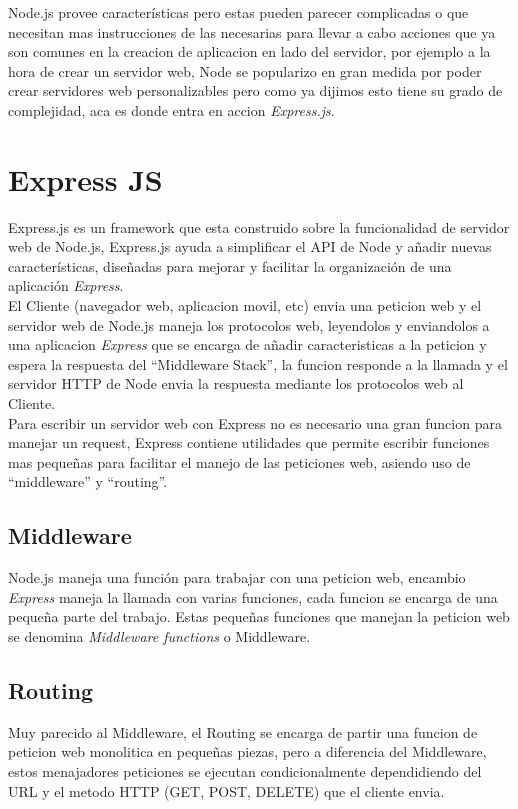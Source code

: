    Node.js provee caracter\'isticas pero estas pueden parecer complicadas o que necesitan mas instrucciones de las necesarias para llevar a cabo acciones que ya son comunes en la creacion de aplicacion en lado del servidor, por ejemplo a la hora de crear un servidor web, Node se popularizo en gran medida por poder crear servidores web personalizables pero como ya dijimos esto tiene su grado de complejidad, aca es donde entra en accion \emph{Express.js}.

  \section{Express JS}
  \label{sec:express_js}
    Express.js es un framework que esta construido sobre la funcionalidad de servidor web de Node.js, Express.js ayuda a simplificar el API de Node y a\~nadir nuevas caracter\'isticas, dise\~nadas para mejorar y facilitar la organizaci\'on de una aplicaci\'on \emph{Express}.\\

    El Cliente (navegador web, aplicacion movil, etc) envia una peticion web y el servidor web de Node.js maneja los protocolos web, leyendolos y enviandolos a una aplicacion \emph{Express} que se encarga de a\~nadir caracteristicas a la peticion y espera la respuesta del ``Middleware Stack'', la funcion responde a la llamada y el servidor HTTP de Node envia la respuesta mediante los protocolos web al Cliente.\\

    Para escribir un servidor web con Express no es necesario una gran funcion para manejar un request, Express contiene utilidades que permite escribir funciones mas peque\~nas para facilitar el manejo de las peticiones web, asiendo uso de ``middleware'' y ``routing''.

    \subsection{Middleware}
    \label{sub:middleware}
      Node.js maneja una funci\'on para trabajar con una peticion web, encambio \emph{Express} maneja la llamada con varias funciones, cada funcion se encarga de una peque\~na parte del trabajo. Estas peque\~nas funciones que manejan la peticion web se denomina \emph{Middleware functions} o Middleware.


    \subsection{Routing}
    \label{sub:routing}
      Muy parecido al Middleware, el Routing se encarga de partir una funcion de peticion web monolitica en peque\~nas piezas, pero a diferencia del Middleware, estos menajadores peticiones se ejecutan condicionalmente dependidiendo del URL y el metodo HTTP (GET, POST, DELETE) que el cliente envia.\\

